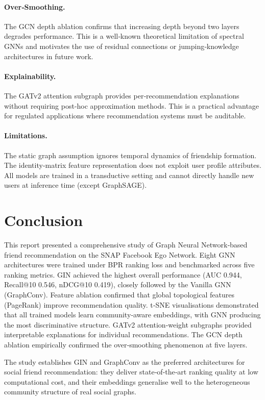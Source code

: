 \documentclass[conference]{IEEEtran}
\begin{document}
\paragraph{Over‑Smoothing.} The GCN depth ablation confirms that increasing depth beyond two layers degrades performance. This is a well‑known theoretical limitation of spectral GNNs and motivates the use of residual connections or jumping‑knowledge architectures in future work.

\paragraph{Explainability.} The GATv2 attention subgraph provides per‑recommendation explanations without requiring post‑hoc approximation methods. This is a practical advantage for regulated applications where recommendation systems must be auditable.

\paragraph{Limitations.} The static graph assumption ignores temporal dynamics of friendship formation. The identity‑matrix feature representation does not exploit user profile attributes. All models are trained in a transductive setting and cannot directly handle new users at inference time (except GraphSAGE).

\section{Conclusion}\label{sec:conclusion}
This report presented a comprehensive study of Graph Neural Network‑based friend recommendation on the SNAP Facebook Ego Network. Eight GNN architectures were trained under BPR ranking loss and benchmarked across five ranking metrics. GIN achieved the highest overall performance (AUC 0.944, Recall@10 0.546, nDCG@10 0.419), closely followed by the Vanilla GNN (GraphConv). Feature ablation confirmed that global topological features (PageRank) improve recommendation quality. t‑SNE visualisations demonstrated that all trained models learn community‑aware embeddings, with GNN producing the most discriminative structure. GATv2 attention‑weight subgraphs provided interpretable explanations for individual recommendations. The GCN depth ablation empirically confirmed the over‑smoothing phenomenon at five layers.

The study establishes GIN and GraphConv as the preferred architectures for social friend recommendation: they deliver state‑of‑the‑art ranking quality at low computational cost, and their embeddings generalise well to the heterogeneous community structure of real social graphs.
\end{document}

